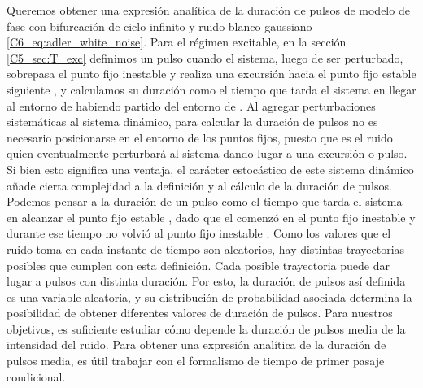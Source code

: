 \documentclass[./main.tex]{subfiles}
\begin{document}
Queremos obtener una expresión analítica de la duración de pulsos de modelo de fase con bifurcación de ciclo infinito y ruido blanco gaussiano \ref{C6_eq:adler_white_noise}. Para el régimen excitable, en la sección \ref{C5_sec:T_exc} definimos un pulso cuando el sistema, luego de ser perturbado, sobrepasa el punto fijo inestable \xxi y realiza una excursión hacia el punto fijo estable siguiente \xxe, y calculamos su duración como el tiempo que tarda el sistema en llegar al entorno de \xxe habiendo partido del entorno de \xxi. Al agregar perturbaciones sistemáticas al sistema dinámico, para calcular la duración de pulsos no es necesario posicionarse en el entorno de los puntos fijos, puesto que es el ruido quien eventualmente perturbará al sistema dando lugar a una excursión o pulso. Si bien esto significa una ventaja, el carácter estocástico de este sistema dinámico añade cierta complejidad a la definición y al cálculo de la duración de pulsos. Podemos pensar a la duración de un pulso como el tiempo que tarda el sistema en alcanzar el punto fijo estable \xxe, dado que el comenzó en el punto fijo inestable \xxi y durante ese tiempo no volvió al punto fijo inestable \xxi. Como los valores que el ruido toma en cada instante de tiempo son aleatorios, hay distintas trayectorias posibles que cumplen con esta definición. Cada posible trayectoria puede dar lugar a pulsos con distinta duración. Por esto, la duración de pulsos así definida es una variable aleatoria, y su distribución de probabilidad asociada determina la posibilidad de obtener diferentes valores de duración de pulsos. Para nuestros objetivos, es suficiente estudiar cómo depende la duración de pulsos media de la intensidad del ruido. Para obtener una expresión analítica de la duración de pulsos media, es útil trabajar con el formalismo de tiempo de primer pasaje condicional. 
\end{document}
